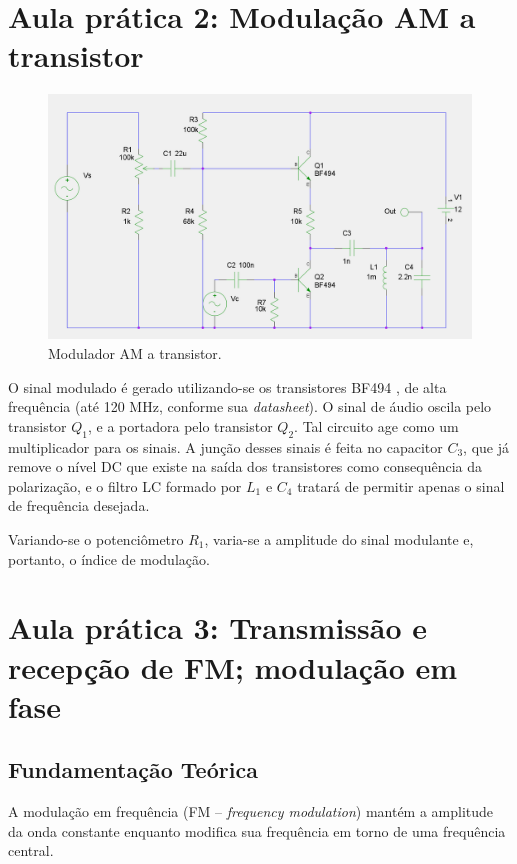 \documentclass[]{report}
\begin{document}
\chapter{Aula prática 2: Modulação AM a transistor}

\begin{figure}[H]
\begin{center}
\includegraphics[scale=0.25,clip]{./imagens/AM_Modulator_Transistor.png}
\end{center}
\caption{Modulador AM a transistor.}
\label{fig:modulador_AM_transistor}
\end{figure}

O sinal modulado é gerado utilizando-se os transistores BF494 \cite{BF494}, de alta frequência (até 120 MHz, conforme sua \textit{datasheet}). O sinal de áudio oscila pelo transistor $Q_1$, e a portadora pelo transistor $Q_2$. Tal circuito age como um multiplicador para os sinais. A junção desses sinais é feita no capacitor $C_3$, que já remove o nível DC que existe na saída dos transistores como consequência da polarização, e o filtro LC formado por $L_1$ e $C_4$ tratará de permitir apenas o sinal de frequência desejada.

Variando-se o potenciômetro $R_1$, varia-se a amplitude do sinal modulante e, portanto, o índice de modulação.

\chapter{Aula prática 3: Transmissão e recepção de FM; modulação em fase}
\section{Fundamentação Teórica}

A modulação em frequência (FM – \textit{frequency modulation}) mantém a amplitude da onda constante enquanto modifica sua frequência em torno de uma frequência central.
\end{document}
